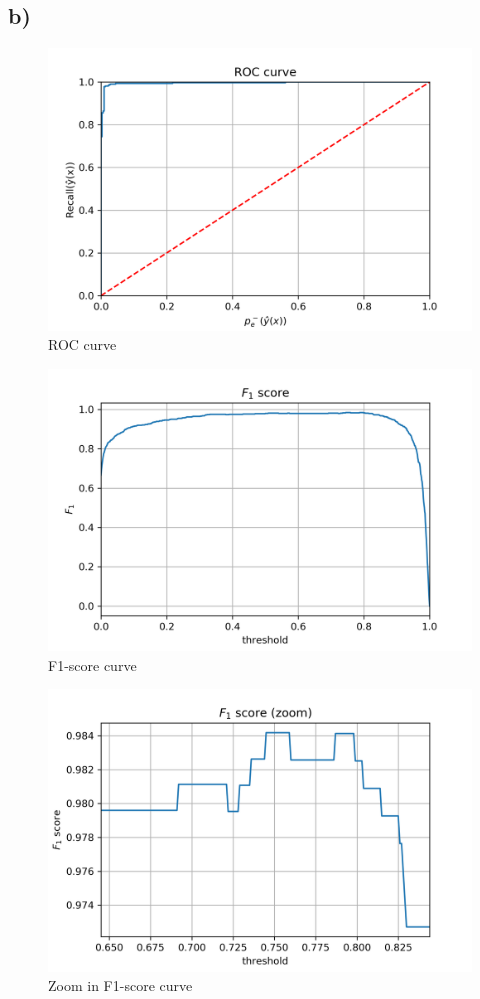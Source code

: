 \documentclass[a4paper]{article}
\begin{document}
\subsection{b) }

\begin{figure}[H]
    \centering
    \includegraphics[width=12cm]{ROC}
    \caption{ROC curve}
    \label{fig:ex1-roc}
\end{figure}

\begin{figure}[H]
    \centering
    \includegraphics[width=12cm]{F1_score}
    \caption{F1-score curve}
    \label{fig:ex1-f1_score}
\end{figure}

\begin{figure}[H]
    \centering
    \includegraphics[width=12cm]{F1_score_zoom}
    \caption{Zoom in F1-score curve}
    \label{fig:ex1-f1_score_zoom}
\end{figure}
\end{document}

